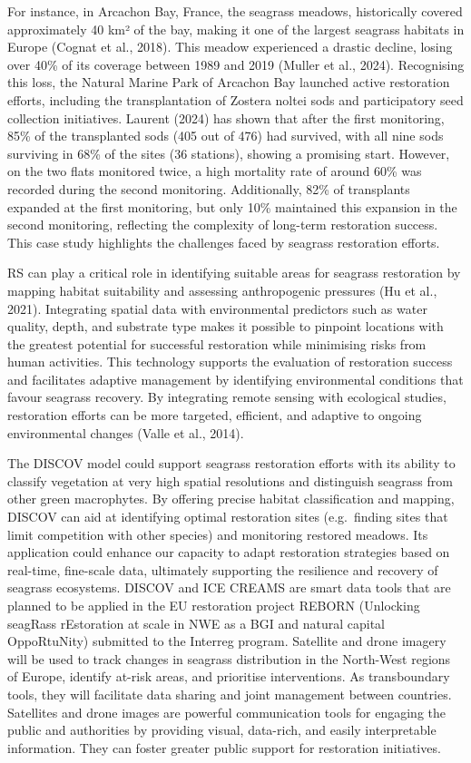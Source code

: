 \documentclass[
  letterpaper,
  11pt,
  english,
  singlespacing,
  headsepline]{MastersDoctoralThesis}
\begin{document}
\begin{spacing}{1.5}
For instance, in Arcachon Bay, France, the seagrass meadows,
historically covered approximately 40 km² of the bay, making it one of
the largest seagrass habitats in Europe (Cognat et al., 2018). This
meadow experienced a drastic decline, losing over 40\% of its coverage
between 1989 and 2019 (Muller et al., 2024). Recognising this loss, the
Natural Marine Park of Arcachon Bay launched active restoration efforts,
including the transplantation of Zostera noltei sods and participatory
seed collection initiatives. Laurent (2024) has shown that after the
first monitoring, 85\% of the transplanted sods (405 out of 476) had
survived, with all nine sods surviving in 68\% of the sites (36
stations), showing a promising start. However, on the two flats
monitored twice, a high mortality rate of around 60\% was recorded
during the second monitoring. Additionally, 82\% of transplants expanded
at the first monitoring, but only 10\% maintained this expansion in the
second monitoring, reflecting the complexity of long-term restoration
success. This case study highlights the challenges faced by seagrass
restoration efforts.

RS can play a critical role in identifying suitable areas for seagrass
restoration by mapping habitat suitability and assessing anthropogenic
pressures (Hu et al., 2021). Integrating spatial data with environmental
predictors such as water quality, depth, and substrate type makes it
possible to pinpoint locations with the greatest potential for
successful restoration while minimising risks from human activities.
This technology supports the evaluation of restoration success and
facilitates adaptive management by identifying environmental conditions
that favour seagrass recovery. By integrating remote sensing with
ecological studies, restoration efforts can be more targeted, efficient,
and adaptive to ongoing environmental changes (Valle et al., 2014).

The DISCOV model could support seagrass restoration efforts with its
ability to classify vegetation at very high spatial resolutions and
distinguish seagrass from other green macrophytes. By offering precise
habitat classification and mapping, DISCOV can aid at identifying
optimal restoration sites (e.g.~finding sites that limit competition
with other species) and monitoring restored meadows. Its application
could enhance our capacity to adapt restoration strategies based on
real-time, fine-scale data, ultimately supporting the resilience and
recovery of seagrass ecosystems. DISCOV and ICE CREAMS are smart data
tools that are planned to be applied in the EU restoration project
REBORN (Unlocking seagRass rEstoration at scale in NWE as a BGI and
natural capital OppoRtuNity) submitted to the Interreg program.
Satellite and drone imagery will be used to track changes in seagrass
distribution in the North-West regions of Europe, identify at-risk
areas, and prioritise interventions. As transboundary tools, they will
facilitate data sharing and joint management between countries.
Satellites and drone images are powerful communication tools for
engaging the public and authorities by providing visual, data-rich, and
easily interpretable information. They can foster greater public support
for restoration initiatives.


\end{spacing}
\end{document}
